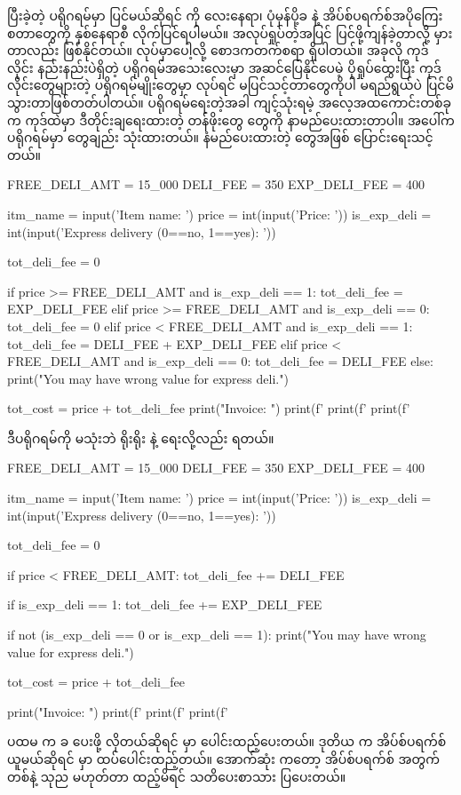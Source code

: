 ပြီးခဲ့တဲ့ ပရိုဂရမ်မှာ ပြင်မယ်ဆိုရင်  ကို လေးနေရာ၊ ပုံမှန်ပို့ခ  နဲ့ အိပ်စ်ပရက်စ်အပိုကြေး  စတာတွေကို နှစ်နေရာစီ လိုက်ပြင်ရပါမယ်။ အလုပ်ရှုပ်တဲ့အပြင် ပြင်ဖို့ကျန်ခဲ့တာလို့  မှားတာလည်း ဖြစ်နိုင်တယ်။  လုပ်မှာပေါ့လို့ စောဒကတက်စရာ ရှိပါတယ်။ အခုလို ကုဒ်လိုင်း နည်းနည်းပဲရှိတဲ့ ပရိုဂရမ်အသေးလေးမှာ အဆင်ပြေနိုင်ပေမဲ့ ပိုရှုပ်ထွေးပြီး ကုဒ်လိုင်းတွေများတဲ့ ပရိုဂရမ်မျိုးတွေမှာ  လုပ်ရင် မပြင်သင့်တာတွေကိုပါ မရည်ရွယ်ပဲ ပြင်မိသွားတာဖြစ်တတ်ပါတယ်။ ပရိုဂရမ်ရေးတဲ့အခါ ကျင့်သုံးရမဲ့ အလေ့အထကောင်းတစ်ခုက ကုဒ်ထဲမှာ ဒီတိုင်းချရေးထားတဲ့ တန်ဖိုးတွေ  တွေကို နာမည်ပေးထားတာပါ။ အပေါ်က ပရိုဂရမ်မှာ  တွေချည်း သုံးထားတယ်။ နံမည်ပေးထားတဲ့   တွေအဖြစ် ပြောင်းရေးသင့်တယ်။
%
\begin{py}
FREE_DELI_AMT = 15_000
DELI_FEE = 350
EXP_DELI_FEE = 400

itm_name = input('Item name: ')
price = int(input('Price: '))
is_exp_deli = int(input('Express delivery (0==no, 1==yes): '))

tot_deli_fee = 0

if price >= FREE_DELI_AMT and is_exp_deli == 1:
    tot_deli_fee = EXP_DELI_FEE
elif price >= FREE_DELI_AMT and is_exp_deli == 0:
    tot_deli_fee = 0
elif price < FREE_DELI_AMT and is_exp_deli == 1:
    tot_deli_fee = DELI_FEE + EXP_DELI_FEE
elif price < FREE_DELI_AMT and is_exp_deli == 0:
    tot_deli_fee = DELI_FEE
else:
    print("You may have wrong value for express deli.")

tot_cost = price + tot_deli_fee
print("Invoice: ")
print(f'%
print(f'%
print(f'%
\end{py}
%

ဒီပရိုဂရမ်ကို   မသုံးဘဲ ရိုးရိုး  နဲ့ ရေးလို့လည်း ရတယ်။ 
%
\begin{py}
FREE_DELI_AMT = 15_000
DELI_FEE = 350
EXP_DELI_FEE = 400

itm_name = input('Item name: ')
price = int(input('Price: '))
is_exp_deli = int(input('Express delivery (0==no, 1==yes): '))

tot_deli_fee = 0

if price < FREE_DELI_AMT:
    tot_deli_fee += DELI_FEE

if is_exp_deli == 1:
    tot_deli_fee += EXP_DELI_FEE

if not (is_exp_deli == 0 or is_exp_deli == 1):
    print("You may have wrong value for express deli.")

tot_cost = price + tot_deli_fee

print("Invoice: ")
print(f'%
print(f'%
print(f'%
\end{py}
%
ပထမ  က  ခ ပေးဖို့ လိုတယ်ဆိုရင်  မှာ  ပေါင်းထည့်ပေးတယ်။ ဒုတိယ  က အိပ်စ်ပရက်စ်  ယူမယ်ဆိုရင်  မှာ  ထပ်ပေါင်းထည့်တယ်။ အောက်ဆုံး  ကတော့ အိပ်စ်ပရက်စ်  အတွက် တစ်နဲ့ သုည မဟုတ်တာ ထည့်မိရင် သတိပေးစာသား ပြပေးတယ်။

